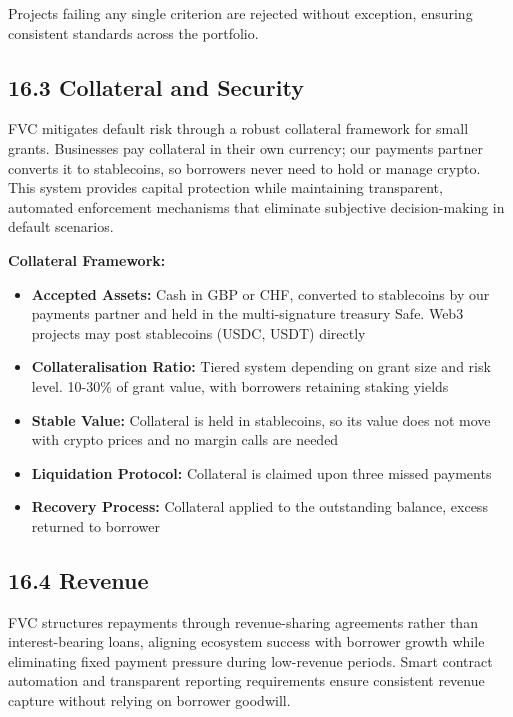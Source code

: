 \documentclass[
  paper=a4,
  ,captions=tableheading
]{scrartcl}
\providecommand{\tightlist}{%
  \setlength{\itemsep}{0pt}\setlength{\parskip}{0pt}}
\begin{document}
Projects failing any single criterion are rejected without exception,
ensuring consistent standards across the portfolio.

\subsection{16.3 Collateral and Security}\label{collateral-and-security}

FVC mitigates default risk through a robust collateral framework for
small grants. Businesses pay collateral in their own currency; our
payments partner converts it to stablecoins, so borrowers never need to
hold or manage crypto. This system provides
capital protection while maintaining transparent, automated enforcement
mechanisms that eliminate subjective decision-making in default
scenarios.

\textbf{Collateral Framework:}

\begin{itemize}
\tightlist
\item
  \textbf{Accepted Assets:} Cash in GBP or CHF, converted to stablecoins
  by our payments partner and held in the multi-signature treasury Safe.
  Web3 projects may post stablecoins (USDC, USDT) directly
\item
  \textbf{Collateralisation Ratio:} Tiered system depending on grant
  size and risk level. 10-30\% of grant value, with borrowers retaining
  staking yields
\item
  \textbf{Stable Value:} Collateral is held in stablecoins, so its value
  does not move with crypto prices and no margin calls are needed
\item
  \textbf{Liquidation Protocol:} Collateral is claimed upon three missed
  payments
\item
  \textbf{Recovery Process:} Collateral applied to the outstanding
  balance, excess returned to borrower
\end{itemize}

\subsection{16.4 Revenue}\label{revenue}

FVC structures repayments through revenue-sharing agreements rather than
interest-bearing loans, aligning ecosystem success with borrower growth
while eliminating fixed payment pressure during low-revenue periods.
Smart contract automation and transparent reporting requirements ensure
consistent revenue capture without relying on borrower goodwill.
\end{document}
